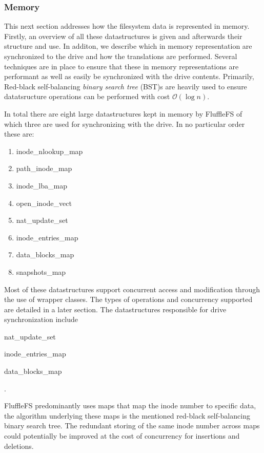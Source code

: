 \subsubsection{Memory}

This next section addresses how the filesystem data is represented in memory.
Firstly, an overview of all these datastructures is given and afterwards their
structure and use. In additon, we describe which in memory representation are
synchronized to the drive and how the translations are performed. Several
techniques are in place to ensure that these in memory representations are
performant as well as easily be synchronized with the drive contents. Primarily,
Red-black self-balancing \textit{binary search tree} (BST)s
\cite{Bayer2004SymmetricBB} are heavily used to ensure datatsructure operations
can be performed with cost $\mathcal{O}(\log n)$.

In total there are eight large datastructures kept in memory by FluffleFS of
which three are used for synchronizing with the drive. In no particular order
these are:

\begin{enumerate}
    \item inode\_nlookup\_map
    \item path\_inode\_map
    \item inode\_lba\_map
    \item open\_inode\_vect
    \item nat\_update\_set
    \item inode\_entries\_map
    \item data\_blocks\_map
    \item snapshots\_map
\end{enumerate}

Most of these datastructures support concurrent access and modification through
the use of wrapper classes. The types of operations and concurrency supported
are detailed in a later section. The datastructures responsible for drive
synchronization include \begin{enumerate*} \item nat\_update\_set 
    \item inode\_entries\_map \item data\_blocks\_map \end{enumerate*}.

FluffleFS predominantly uses maps that map the inode number to specific data,
the algorithm underlying these maps is the mentioned red-black self-balancing
binary search tree. The redundant storing of the same inode number across
maps could potentially be improved at the cost of concurrency for insertions
and deletions.

